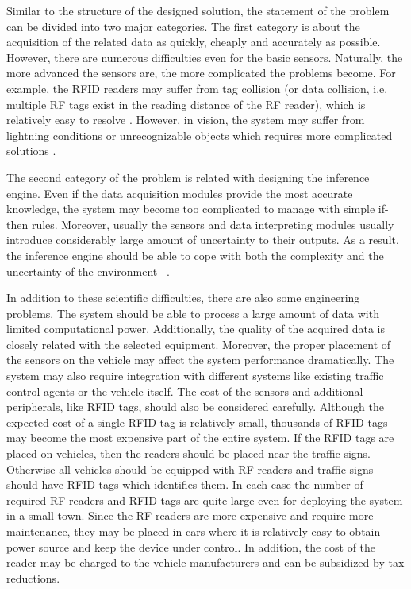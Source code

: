 \documentclass[a4paper,oneside,12pt]{report}
\begin{document}
Similar to the structure of the designed solution, the statement of the problem can be divided into two major categories. The first category is about the acquisition of the related data as quickly, cheaply and accurately as possible. However, there are numerous difficulties even for the basic sensors. Naturally, the more advanced the sensors are, the more complicated the problems become. For example, the RFID readers may suffer from tag collision (or data collision, i.e. multiple RF tags exist in the reading distance of the RF reader), which is relatively easy to resolve \cite{finkenzeller_fundamentals_2010}. However, in vision, the system may suffer from lightning conditions or unrecognizable objects which requires more complicated solutions \cite{kaplan_fast_2010}. 

The second category of the problem is related with designing the inference engine. Even if the data acquisition modules provide the most accurate knowledge, the system may become too complicated to manage with simple if-then rules. Moreover, usually the sensors and data interpreting modules usually introduce considerably large amount of uncertainty to their outputs. As a result, the inference engine should be able to cope with both the complexity and the uncertainty of the environment ~\cite{cooper_computational_1990}.

In addition to these scientific difficulties, there are also some engineering problems. The system should be able to process a large amount of data with limited computational power. Additionally, the quality of the acquired data is closely related with the selected equipment. Moreover, the proper placement of the sensors on the vehicle may affect the system performance dramatically. The system may also require integration with different systems like existing traffic control agents or the vehicle itself. The cost of the sensors and additional peripherals, like RFID tags, should also be considered carefully. Although the expected cost of a single RFID tag is relatively small, thousands of RFID tags may become the most expensive part of the entire system. If the RFID tags are placed on vehicles, then the readers should be placed near the traffic signs. Otherwise all vehicles should be equipped with RF readers and traffic signs should have RFID tags which identifies them. In each case the number of required RF readers and RFID tags are quite large even for deploying the system in a small town. Since the RF readers are more expensive and require more maintenance, they may be placed in cars where it is relatively easy to obtain power source and keep the device under control. In addition, the cost of the reader may be charged to the vehicle manufacturers and can be subsidized by tax reductions.
\end{document}
